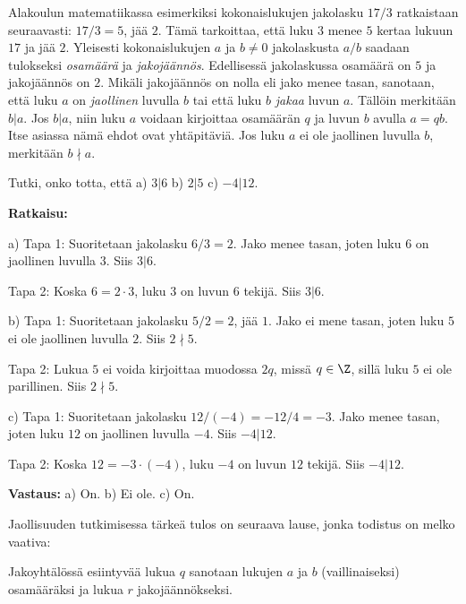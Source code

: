 Alakoulun matematiikassa esimerkiksi kokonaislukujen jakolasku $17/3$ ratkaistaan seuraavasti: $17/3 = 5$, jää $2$. Tämä tarkoittaa, että luku $3$ menee $5$ kertaa lukuun $17$ ja jää $2$. Yleisesti kokonaislukujen $a$ ja $b \neq 0$ jakolaskusta $a/b$ saadaan tulokseksi {\em osamäärä} ja {\em jakojäännös}. Edellisessä jakolaskussa osamäärä on $5$ ja jakojäännös on $2$. Mikäli jakojäännös on nolla eli jako menee tasan, sanotaan, että luku $a$ on {\em jaollinen} luvulla $b$ tai että luku $b$ {\em jakaa} luvun $a$. Tällöin merkitään $b|a$. Jos $b|a$, niin luku $a$ voidaan kirjoittaa osamäärän $q$ ja luvun $b$ avulla $a = qb$. Itse asiassa nämä ehdot ovat yhtäpitäviä. Jos luku $a$ ei ole jaollinen luvulla $b$, merkitään $b \nmid a$.

\begin{esimerkki}
 Tutki, onko totta, että a)  $3 | 6$  b)  $2 | 5$ c) $-4|12$.

{\bf Ratkaisu:}

a) Tapa 1: Suoritetaan jakolasku $6/3= 2$. Jako menee tasan, joten luku $6$ on jaollinen luvulla $3$. Siis $3 | 6$.

Tapa 2: Koska $6 = 2 \cdot 3$, luku $3$ on luvun $6$ tekijä. Siis $3 | 6$.

b) Tapa 1: Suoritetaan jakolasku $5/2 = 2$, jää $1$. Jako ei mene tasan, joten luku $5$ ei ole jaollinen luvulla $2$. Siis $2 \nmid 5$.

Tapa 2: Lukua $5$ ei voida kirjoittaa muodossa $2q$, missä $q\in\Z$, sillä luku $5$ ei ole parillinen. Siis $2 \nmid 5$.

c) 
Tapa 1: Suoritetaan jakolasku $12/(-4)=-12/4= -3$. Jako menee tasan, joten luku $12$ on jaollinen luvulla $-4$. Siis $-4 | 12$.

Tapa 2: Koska $12 = -3 \cdot (-4)$, luku $-4$ on luvun $12$ tekijä. Siis $-4 | 12$.

{\bf Vastaus:} a) On.  b) Ei ole. c) On.
\end{esimerkki}

Jaollisuuden tutkimisessa tärkeä tulos on seuraava lause, jonka todistus on melko vaativa:


Jakoyhtälössä esiintyvää lukua $q$ sanotaan lukujen $a$ ja $b$ (vaillinaiseksi) osamääräksi ja lukua $r$  jakojäännökseksi.


